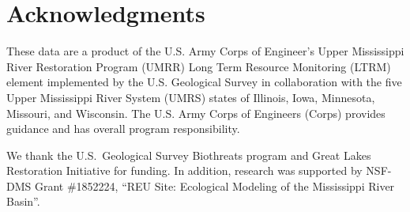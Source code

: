 \documentclass[preprint,review,12pt,authoryear]{elsarticle}
\begin{document}
\section{Acknowledgments}

These data are a product of the U.S. Army Corps of Engineer's Upper Mississippi River Restoration Program (UMRR) Long Term Resource Monitoring (LTRM) element implemented by the U.S. Geological Survey in collaboration with the five Upper Mississippi River System (UMRS) states of Illinois, Iowa, Minnesota, Missouri, and Wisconsin.
The U.S. Army Corps of Engineers (Corps) provides guidance and has overall program responsibility.

We thank the U.S.~Geological Survey  Biothreats program and Great Lakes Restoration Initiative for funding.
In addition, research was supported by NSF-DMS Grant \#1852224, ``REU Site: Ecological Modeling of the Mississippi River Basin''. 

  
 
\end{document}
